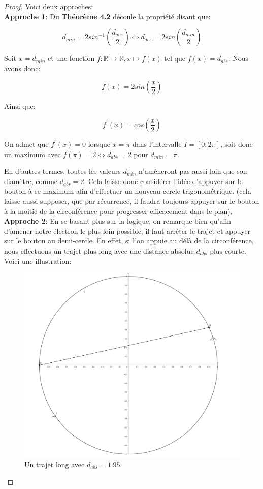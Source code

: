 \documentclass{amsart}
\theoremstyle{definition}
\theoremstyle{remark}
\numberwithin{equation}{section}
\begin{document}
\begin{proof}
  Voici deux approches:\\
  
  \textbf{Approche 1}: Du \textbf{Théorème 4.2} découle la propriété disant que: 

  \[d_{min}=2sin^{-1}(\frac{d_{abs}}{2}) \Leftrightarrow d_{abs}=2sin(\frac{d_{min}}{2})\]

  Soit $x=d_{min}$ et une fonction $f:\mathbb{R}\longrightarrow \mathbb{R}, x\longmapsto f(x)$ tel que  $f(x)=d_{abs}$. Nous avons donc:

  \[f(x)=2sin(\frac{x}{2})\]

  Ainsi que:

  \[f^\prime(x)=cos(\frac{x}{2})\]

  On admet que $f^\prime(x)=0$ lorsque $x=\pi$ dans l'intervalle $I=[0;2\pi]$, soit donc un maximum avec $f(\pi)=2 \Leftrightarrow d_{abs}=2$ pour $d_{min}=\pi$. 

  En d'autres termes, toutes les valeurs $d_{min}$ n'amèneront pas aussi loin que son diamètre, comme $d_{abs}=2$. Cela laisse donc considérer l'idée d'appuyer sur le bouton à ce maximum afin d'effectuer un nouveau cercle trigonométrique. 
  (cela laisse aussi supposer, que par récurrence, il faudra toujours appuyer sur le bouton à la moitié de la circonférence pour progresser efficacement dans le plan).\\

  \textbf{Approche 2}: En se basant plus sur la logique, on remarque bien qu'afin d'amener notre électron le plus loin possible, il faut arrêter le trajet et appuyer sur le bouton
  au demi-cercle. En effet, si l'on appuie au délà de la circonférence, nous effectuons un trajet plus long avec une distance absolue $d_{abs}$ plus courte. Voici une illustration:

  \begin{figure}[H]
    \centering
    \includegraphics[scale=0.13]{ab_circle1.png}
    \caption{Un trajet long avec $d_{abs}=1.95$.}
  \end{figure}


\end{proof}
\end{document}

